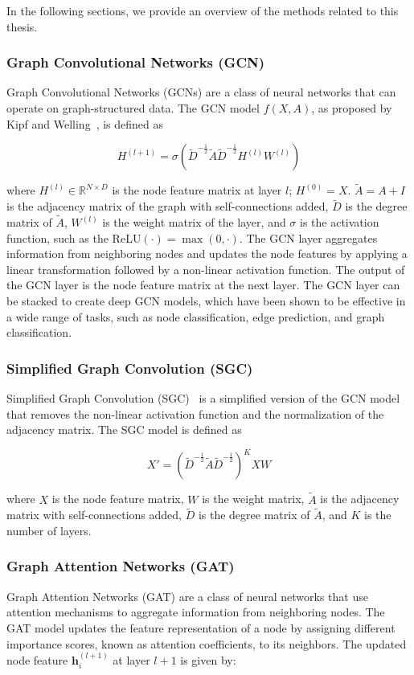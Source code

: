 \documentclass{article}
\begin{document}
In the following sections, we provide an overview of the methods related to this thesis.

\subsubsection{Graph Convolutional Networks (GCN)}

Graph Convolutional Networks (GCNs) are a class of neural networks that can operate on graph-structured data. The GCN model $f(X, A)$, as proposed by Kipf and Welling~\cite{kipf2016semi}, is defined as

$$ 
 H^{(l+1)} = \sigma(\tilde{D}^{-\frac{1}{2}}\tilde{A}\tilde{D}^{-\frac{1}{2}}H^{(l)}W^{(l)})
$$

where $H^{(l)}\in \mathbb{R}^{N\times D}$ is the node feature matrix at layer $l$; $H^{(0)} = X$. $\tilde{A} = A + I$ is the adjacency matrix of the graph with self-connections added, $\tilde{D}$ is the degree matrix of $\tilde{A}$, $W^{(l)}$ is the weight matrix of the layer, and $\sigma$ is the activation function, such as the $\text{ReLU}(\cdot)=\max(0,\cdot)$. The GCN layer aggregates information from neighboring nodes and updates the node features by applying a linear transformation followed by a non-linear activation function. The output of the GCN layer is the node feature matrix at the next layer. The GCN layer can be stacked to create deep GCN models, which have been shown to be effective in a wide range of tasks, such as node classification, edge prediction, and graph classification.


\subsubsection{Simplified Graph Convolution (SGC)}

Simplified Graph Convolution (SGC)~\cite{wu2019simplifying} is a simplified version of the GCN model that removes the non-linear activation function and the normalization of the adjacency matrix. The SGC model is defined as

$$
 X' = (\tilde{D}^{-\frac{1}{2}}\tilde{A}\tilde{D}^{-\frac{1}{2}})^K XW
$$

where $X$ is the node feature matrix, $W$ is the weight matrix, $\tilde{A}$ is the adjacency matrix with self-connections added, $\tilde{D}$ is the degree matrix of $\tilde{A}$, and $K$ is the number of layers. 


\subsubsection{Graph Attention Networks (GAT)}
Graph Attention Networks (GAT) are a class of neural networks that use attention mechanisms to aggregate information from neighboring nodes. The GAT model updates the feature representation of a node by assigning different importance scores, known as attention coefficients, to its neighbors. The updated node feature $\mathbf{h}_i^{(l+1)}$ at layer $l+1$ is given by:
\end{document}
